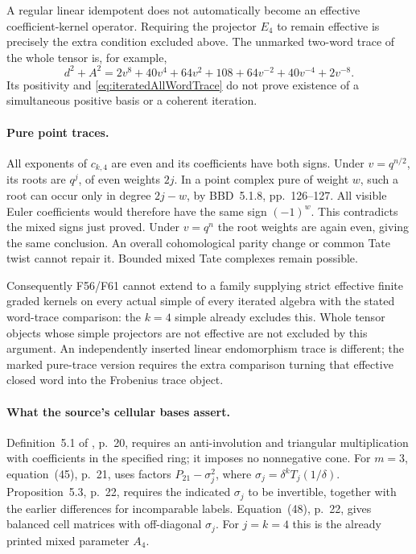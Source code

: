 \documentclass[11pt,a4paper]{article}
\newcommand{\fid}[1]{\textsf{#1}}\newcommand{\gate}[1]{\textsf{#1}}
\theoremstyle{named}\newtheorem{finding}{Finding}[section]
\theoremstyle{definition}\newtheorem{definition}[finding]{Definition}
\theoremstyle{remark}\newtheorem{remark}[finding]{Remark}
\begin{document}
A regular linear idempotent does not automatically become
an effective coefficient-kernel operator. Requiring the
projector \(E_4\) to remain effective is precisely the
extra condition excluded above. The unmarked two-word
trace of the whole tensor is, for example,
\[
 d^2+A^2
 =2v^8+40v^4+64v^2+108+64v^{-2}+40v^{-4}+2v^{-8}.
\]
Its positivity and \eqref{eq:iteratedAllWordTrace} do not
prove existence of a simultaneous positive basis or a
coherent iteration.

\paragraph{Pure point traces.}
All exponents of \(c_{k,4}\) are even and its coefficients
have both signs. Under \(v=q^{n/2}\), its roots are
\(q^j\), of even weights \(2j\). In a point complex
pure of weight \(w\), such a root can occur only in
degree \(2j-w\), by BBD~5.1.8, pp.~126--127.
All visible Euler coefficients would therefore have
the same sign \((-1)^w\). This contradicts the mixed
signs just proved. Under \(v=q^n\) the root weights
are again even, giving the same conclusion.
An overall cohomological parity change or common Tate
twist cannot repair it. Bounded mixed Tate complexes
remain possible.

Consequently \fid{F56}/\fid{F61} cannot extend to a
family supplying strict effective finite graded kernels
on every actual simple of every iterated algebra with
the stated word-trace comparison: the \(k=4\) simple
already excludes this. Whole tensor objects whose simple
projectors are not effective are not excluded by this
argument. An independently inserted linear endomorphism
trace is different; the marked pure-trace version
requires the extra comparison turning that effective
closed word into the Frobenius trace object.

\paragraph{What the source's cellular bases assert.}
Definition~5.1 of \cite{BlasiakChebyshev}, p.~20,
requires an anti-involution and triangular multiplication
with coefficients in the specified ring; it imposes no
nonnegative cone.
For \(m=3\), equation~(45), p.~21, uses factors
\(P_{21}-\sigma_j^2\), where
\(\sigma_j=\delta^kT_j(1/\delta)\).
Proposition~5.3, p.~22, requires the indicated
\(\sigma_j\) to be invertible, together with the
earlier differences for incomparable labels.
Equation~(48), p.~22, gives balanced cell matrices
with off-diagonal \(\sigma_j\).
For \(j=k=4\) this is the already printed mixed
parameter \(A_4\).
\end{document}
